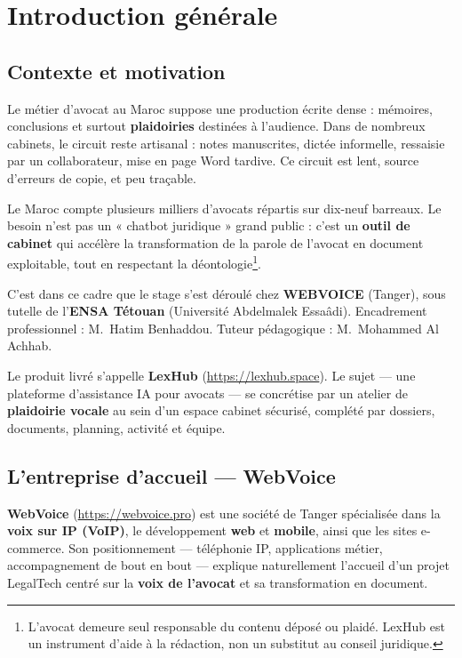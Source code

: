 \chapter{Introduction générale}
\label{ch:intro}

\section{Contexte et motivation}

Le métier d'avocat au Maroc suppose une production écrite dense : mémoires, conclusions et surtout \textbf{plaidoiries} destinées à l'audience. Dans de nombreux cabinets, le circuit reste artisanal : notes manuscrites, dictée informelle, ressaisie par un collaborateur, mise en page Word tardive. Ce circuit est lent, source d'erreurs de copie, et peu traçable.

Le Maroc compte plusieurs milliers d'avocats répartis sur dix-neuf barreaux. Le besoin n'est pas un « chatbot juridique » grand public : c'est un \textbf{outil de cabinet} qui accélère la transformation de la parole de l'avocat en document exploitable, tout en respectant la déontologie\footnote{L'avocat demeure seul responsable du contenu déposé ou plaidé. LexHub est un instrument d'aide à la rédaction, non un substitut au conseil juridique.}.

C'est dans ce cadre que le stage s'est déroulé chez \textbf{WEBVOICE} (Tanger), sous tutelle de l'\textbf{ENSA Tétouan} (Université Abdelmalek Essaâdi). Encadrement professionnel : M.~Hatim Benhaddou. Tuteur pédagogique : M.~Mohammed Al Achhab.

Le produit livré s'appelle \textbf{LexHub} (\url{https://lexhub.space}). Le sujet --- une plateforme d'assistance IA pour avocats --- se concrétise par un atelier de \textbf{plaidoirie vocale} au sein d'un espace cabinet sécurisé, complété par dossiers, documents, planning, activité et équipe.

\section{L'entreprise d'accueil --- WebVoice}
\label{sec:webvoice}

\textbf{WebVoice} (\url{https://webvoice.pro}) est une société de Tanger spécialisée dans la \textbf{voix sur IP (VoIP)}, le développement \textbf{web} et \textbf{mobile}, ainsi que les sites e-commerce. Son positionnement --- téléphonie IP, applications métier, accompagnement de bout en bout --- explique naturellement l'accueil d'un projet LegalTech centré sur la \textbf{voix de l'avocat} et sa transformation en document.


